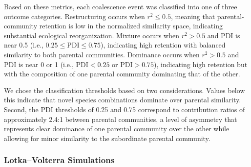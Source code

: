 Based on these metrics, each coalescence event was classified into one of three outcome categories. Restructuring occurs when $r^2 \leq 0.5$,  meaning that parental-community retention is low in the normalized similarity space, indicating substantial ecological reorganization. Mixture occurs when $r^2 > 0.5$ and PDI is near 0.5 (i.e., $0.25 \leq \text{PDI} \leq 0.75$), indicating high retention with balanced similarity to both parental communities. Dominance occurs when $r^2 > 0.5$ and PDI is near 0 or 1 (i.e., $\text{PDI} < 0.25$ or $\text{PDI} > 0.75$), indicating high retention but with the composition of one parental community dominating that of the other.

We chose the classification thresholds based on two considerations.  Values below this indicate that novel species combinations dominate over parental similarity. Second, the PDI thresholds of 0.25 and 0.75 correspond to contribution ratios of approximately 2.4:1 between parental communities, a level of asymmetry that represents clear dominance of one parental community over the other while allowing for minor similarity to the subordinate parental community. 


\subsubsection*{Lotka--Volterra Simulations}
\label{sec:suppl:methods:simulations}

